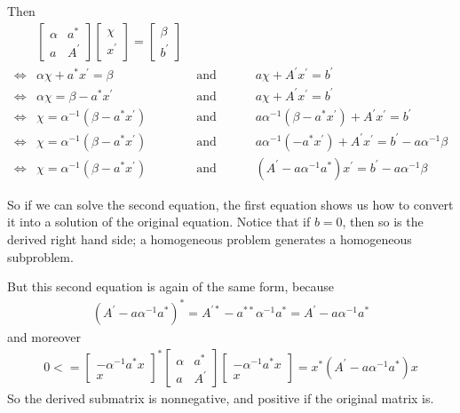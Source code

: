 \documentclass{article}
\begin{document}
Then
\begin{align*}
&\begin{bmatrix}\alpha & a^* \\ a & A^{'}\end{bmatrix}\begin{bmatrix}\chi\\x^{'}\end{bmatrix}=\begin{bmatrix}\beta\\b^{'}\end{bmatrix}
\\\iff&
\alpha\chi + a^*x^{'} = \beta &\text{ and }\hspace{2em}&
a\chi + A^{'}x^{'} = b^{'}
\\\iff&
\alpha\chi= \beta - a^*x^{'}  &\text{ and }\hspace{2em}&
a\chi + A^{'}x^{'} = b^{'}
\\\iff&
\chi= \alpha^{-1}(\beta - a^*x^{'}) &\text{ and }\hspace{2em}&
a\alpha^{-1}(\beta - a^*x^{'}) + A^{'}x^{'} = b^{'}
\\\iff&
\chi= \alpha^{-1}(\beta - a^*x^{'}) &\text{ and }\hspace{2em}&
a\alpha^{-1}(- a^*x^{'}) + A^{'}x^{'} = b^{'}-a\alpha^{-1}\beta
\\\iff&
\chi= \alpha^{-1}(\beta - a^*x^{'}) &\text{ and }\hspace{2em}&
(A^{'} - a\alpha^{-1}a^*)x^{'} = b^{'}-a\alpha^{-1}\beta
\end{align*}

  
So if we can solve the second equation, the first equation shows us how to convert it into a solution
of the original equation. Notice that if 
\begin{math}{}b =0\end{math}, then so is the derived right hand side; a homogeneous problem generates
a homogeneous subproblem.

But this second equation is again of the same form, because
\begin{gather}{}(A^{'} - a\alpha^{-1}a^*)^* = 
A^{'*} - a^{**}\alpha^{-1}a^* = 
A^{'} - a\alpha^{-1}a^* 
\end{gather}
and moreover
\begin{gather}{}
0 <= \begin{bmatrix}-\alpha^{-1}a^*x\\x\end{bmatrix}^*\begin{bmatrix}\alpha & a^* \\ a & A^{'}\end{bmatrix}\begin{bmatrix}-\alpha^{-1}a^*x\\x\end{bmatrix}
= 
x^*(A^{'} - a\alpha^{-1}a^*)x
\end{gather} So the derived submatrix is nonnegative, and positive if the original matrix is.
\end{document}
